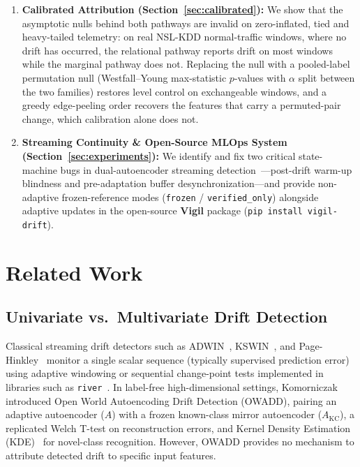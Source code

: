 \documentclass[10pt,conference]{IEEEtran}
\begin{document}
\begin{enumerate}
        Fisher-$z$ scoring, placing both marginal and relational pathways on a
        unified asymptotic Bonferroni $-\log_{10}(p_{\mathrm{FWE}})$ evidence scale.
  \item \textbf{Calibrated Attribution (Section~\ref{sec:calibrated}):} We show
        that the asymptotic nulls behind both pathways are invalid on
        zero-inflated, tied and heavy-tailed telemetry: on real NSL-KDD
        normal-traffic windows, where no drift has occurred, the relational
        pathway reports drift on most windows while the marginal pathway does
        not. Replacing the null with a pooled-label permutation null
        (Westfall--Young max-statistic $p$-values with $\alpha$ split between the
        two families) restores level control on exchangeable windows, and a greedy
        edge-peeling order recovers the features that carry a permuted-pair change,
        which calibration alone does not.
  \item \textbf{Streaming Continuity \& Open-Source MLOps System
        (Section~\ref{sec:experiments}):} We identify and fix two critical
        state-machine bugs in dual-autoencoder streaming detection~\cite{komorniczak2026owadd}---post-drift
        warm-up blindness and pre-adaptation buffer desynchronization---and
        provide non-adaptive frozen-reference modes (\texttt{frozen} /
        \texttt{verified\_only}) alongside adaptive updates in the open-source
        \textbf{Vigil} package (\texttt{pip install vigil-drift}).
\end{enumerate}

\section{Related Work}

\subsection{Univariate vs.\ Multivariate Drift Detection}
Classical streaming drift detectors such as ADWIN~\cite{bifet2007adwin},
KSWIN~\cite{raab2020kswin}, and Page-Hinkley~\cite{page1954continuous} monitor a
single scalar sequence (typically supervised prediction error) using adaptive
windowing or sequential change-point tests implemented in libraries such as
\texttt{river}~\cite{montiel2021river}. In label-free high-dimensional settings,
Komorniczak~\cite{komorniczak2026owadd} introduced Open World Autoencoding
Drift Detection (OWADD), pairing an adaptive autoencoder ($A$) with a frozen
known-class mirror autoencoder ($A_{\mathrm{KC}}$), a replicated Welch T-test on
reconstruction errors, and Kernel Density Estimation (KDE)~\cite{scott1992multivariate}
for novel-class recognition. However, OWADD provides no mechanism to attribute
detected drift to specific input features.
\end{document}
